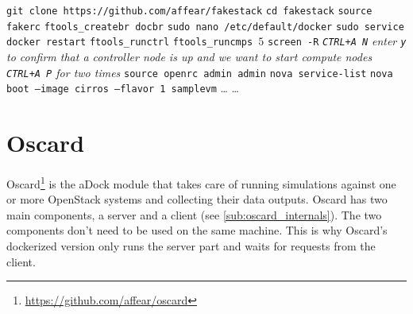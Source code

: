 \begin{algorithm}[H]
\caption{Launching a ``1 + 5'' architecture with aDock}
\label{alg:example}
\begin{algorithmic}[0]
	\State \texttt{git clone https://github.com/affear/fakestack}
	\State \texttt{cd fakestack}
	\State \texttt{source fakerc} 
	\State \texttt{ftools\_createbr docbr} 
	\State \texttt{sudo nano /etc/default/docker} 
	\State \texttt{sudo service docker restart}
	\State %
	\State \texttt{ftools\_runctrl}
	\State {}
	\State \texttt{ftools\_runcmps $5$}
	\State \texttt{screen -R} 
	\State \emph{\texttt{CTRL+A N}} 
	\State
	\State \emph{enter \texttt{y} to confirm that a controller node is up and we want to start compute nodes}
	\State
	\State {}
	\State \emph{\texttt{CTRL+A P} for two times} 
	\State \texttt{source openrc admin admin}
	\State \texttt{nova service-list} 
	\State \texttt{nova boot --image cirros --flavor 1 samplevm} 
	\State \ldots
	\State \ldots {}
\end{algorithmic}
\end{algorithm}


\section{Oscard}
\label{sec:oscard}
Oscard\footnote{\url{https://github.com/affear/oscard}} is the aDock module that takes care of running simulations against one or more OpenStack systems and collecting their data outputs. Oscard has two main components, a server and a client (see \ref{sub:oscard_internals}). The two components don't need to be used on the same machine. This is why Oscard's dockerized version only runs the server part and waits for requests from the client.

